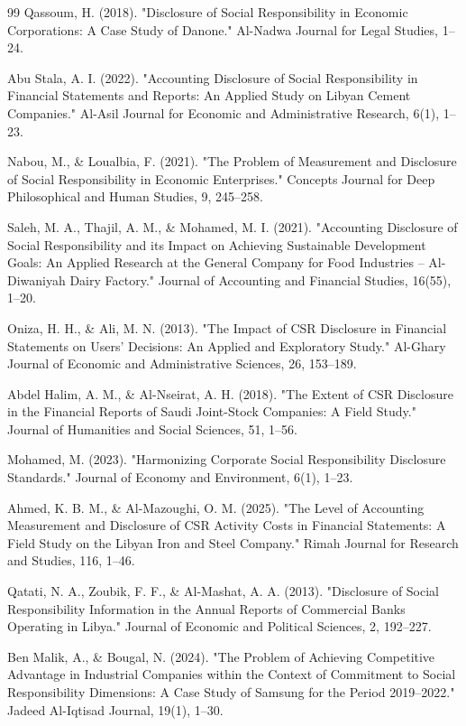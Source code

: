\documentclass[10pt]{NSP1}
\begin{document}
\begin{thebibliography}{99}
Qassoum, H. (2018). "Disclosure of Social Responsibility in Economic Corporations: A Case Study of Danone." Al-Nadwa Journal for Legal Studies, 1–24.

Abu Stala, A. I. (2022). "Accounting Disclosure of Social Responsibility in Financial Statements and Reports: An Applied Study on Libyan Cement Companies." Al-Asil Journal for Economic and Administrative Research, 6(1), 1–23.

Nabou, M., \& Loualbia, F. (2021). "The Problem of Measurement and Disclosure of Social Responsibility in Economic Enterprises." Concepts Journal for Deep Philosophical and Human Studies, 9, 245–258.

Saleh, M. A., Thajil, A. M., \& Mohamed, M. I. (2021). "Accounting Disclosure of Social Responsibility and its Impact on Achieving Sustainable Development Goals: An Applied Research at the General Company for Food Industries – Al-Diwaniyah Dairy Factory." Journal of Accounting and Financial Studies, 16(55), 1–20.

Oniza, H. H., \& Ali, M. N. (2013). "The Impact of CSR Disclosure in Financial Statements on Users' Decisions: An Applied and Exploratory Study." Al-Ghary Journal of Economic and Administrative Sciences, 26, 153–189.

Abdel Halim, A. M., \& Al-Nseirat, A. H. (2018). "The Extent of CSR Disclosure in the Financial Reports of Saudi Joint-Stock Companies: A Field Study." Journal of Humanities and Social Sciences, 51, 1–56.

Mohamed, M. (2023). "Harmonizing Corporate Social Responsibility Disclosure Standards." Journal of Economy and Environment, 6(1), 1–23.

Ahmed, K. B. M., \& Al-Mazoughi, O. M. (2025). "The Level of Accounting Measurement and Disclosure of CSR Activity Costs in Financial Statements: A Field Study on the Libyan Iron and Steel Company." Rimah Journal for Research and Studies, 116, 1–46.

Qatati, N. A., Zoubik, F. F., \& Al-Mashat, A. A. (2013). "Disclosure of Social Responsibility Information in the Annual Reports of Commercial Banks Operating in Libya." Journal of Economic and Political Sciences, 2, 192–227.

Ben Malik, A., \& Bougal, N. (2024). "The Problem of Achieving Competitive Advantage in Industrial Companies within the Context of Commitment to Social Responsibility Dimensions: A Case Study of Samsung for the Period 2019–2022." Jadeed Al-Iqtisad Journal, 19(1), 1–30.


\end{thebibliography}
\end{document}
